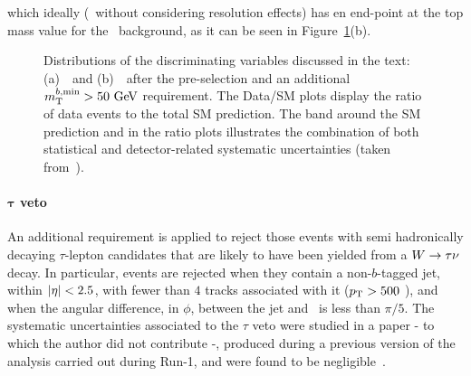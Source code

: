 				\noindent which ideally (\ie\ without considering resolution effects) has en end-point at the top mass value for the \ttbar\ background, as it can be seen in Figure~\ref{fig:preselection}(b).
				\begin{figure}[!htb]
				  \begin{center}
					  \caption{Distributions of the discriminating variables discussed in the text: (a)~\mantikttwelvezero\ and (b)~\mtbmin\ after the pre-selection and an additional $\mtbmin>50\gev$ requirement. The Data/\ac{SM} plots display the ratio of data events to the total \ac{SM} prediction. The band around the \ac{SM} prediction and in the ratio plots illustrates the combination of both statistical and detector-related systematic uncertainties (taken from~\cite{stop0L}).}
					  \label{fig:preselection}
				  \end{center}
				\end{figure}

			\paragraph{$\mathbf{\tau}$ veto}

				An additional requirement is applied to reject those events with semi hadronically decaying $\tau$-lepton candidates that are likely to have been yielded from a $W\rightarrow\tau\nu$ decay. In particular, events are rejected when they contain a non-$b$-tagged jet, within $|\eta| < 2.5$, with fewer than $4$ tracks associated with it ($p_{\mathrm{T}} > 500$ \MeV), and when the angular difference, in $\phi$, between the jet and \ptmiss\ is less than $\pi/5$. The systematic uncertainties associated to the $\tau$ veto were studied in a paper - to which the author did not contribute -, produced during a previous version of the analysis carried out during Run-1, and were found to be negligible~\cite{stop0LRun1}.



